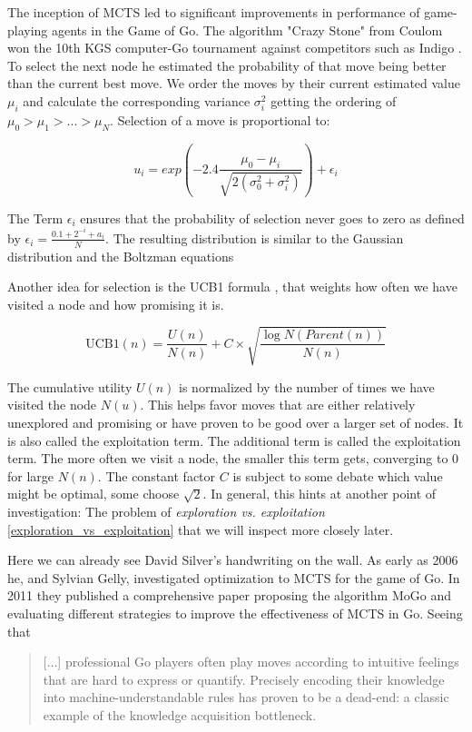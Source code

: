 The inception of MCTS led to significant improvements in performance of game-playing agents in the Game of Go. The algorithm "Crazy Stone" from Coulom won the 10th KGS computer-Go tournament against competitors such as Indigo \cite{bouzy_associating_2006}. To select the next node he estimated the probability of that move being better than the current best move. We order the moves by their current estimated value $ \mu_i $ and calculate the corresponding variance $ \sigma_{i}^{2} $ getting the ordering of $ \mu_0 > \mu_1 > ... > \mu_N $. Selection of a move is proportional to:

$$
    u_i = exp\left(-2.4\frac{\mu_0 - \mu_i}{\sqrt{2(\sigma_{0}^{2} + \sigma_{i}^{2})}}\right) + \epsilon_i
$$

The Term $ \epsilon_i $ ensures that the probability of selection never goes to zero as defined by $ \epsilon_i = \frac{0.1 + 2^{-i} + a_i}{N} $. The resulting distribution is similar to the Gaussian distribution and the Boltzman equations \cite{coulom_efficient_2007}

Another idea for selection is the UCB1 formula \cite{auer_finite-time_nodate}, that weights how often we have visited a node and how promising it is.

$$
    \text{UCB1}(n) = \frac{U(n)}{N(n)} + C \times \sqrt{\frac{\log{N(Parent(n))}}{N(n)}}
$$

The cumulative utility $U(n)$ is normalized by the number of times we have visited the node $N(u)$. This helps favor moves that are either relatively unexplored and promising or have proven to be good over a larger set of nodes. It is also called the exploitation term. The additional term is called the exploitation term. The more often we visit a node, the smaller this term gets, converging to 0 for large $N(n)$. The constant factor $C$ is subject to some debate which value might be optimal, some choose $\sqrt{2}$. In general, this hints at another point of investigation: The problem of \textit{exploration vs. exploitation} \ref{exploration_vs_exploitation} that we will inspect more closely later.

Here we can already see David Silver's handwriting on the wall. As early as 2006 he, and Sylvian Gelly, investigated optimization to MCTS \cite{gelly_achieving_nodate} for the game of Go. In 2011 they published a comprehensive paper \cite{gelly_monte-carlo_2011} proposing the algorithm MoGo and evaluating different strategies to improve the effectiveness of MCTS in Go. Seeing that

\begin{quotation}
    [...] professional Go players often play moves according to intuitive feelings that are hard to express or quantify. Precisely encoding their knowledge into machine-understandable rules has proven to be a dead-end: a classic example of the knowledge acquisition bottleneck.
\end{quotation}

